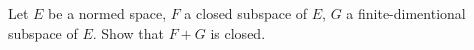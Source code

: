 Let $E$ be a normed space, $F$ a closed subspace of $E$, $G$ a finite-dimentional subspace of $E$. Show that $F + G$ is closed.